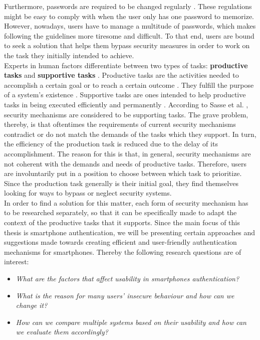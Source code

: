 Furthermore, passwords are required to be changed regularly \cite{adams2,gorman}. These regulations might be easy to comply with when the user only has one password to memorize. However, nowadays, users have to manage a multitude of passwords, which makes following the guidelines more tiresome and difficult. To that end, users are bound to seek a solution that helps them bypass security measures in order to work on the task they initially intended to achieve.\\

Experts in human factors differentiate between two types of tasks: \textbf{productive tasks} and \textbf{supportive tasks} \cite{sasse}. Productive tasks are the activities needed to accomplish a certain goal or to reach a certain outcome \cite{sasse}. They fulfill the purpose of a system's existence \cite{sasse}. Supportive tasks are ones intended to help productive tasks in being executed efficiently and permanently \cite{sasse}. According to Sasse et al. \cite{sasse}, security mechanisms are considered to be supporting tasks. The grave problem, thereby, is that oftentimes the requirements of current security mechanisms contradict or do not match the demands of the tasks which they support. In turn, the efficiency of the production task is reduced due to the delay of its accomplishment. The reason for this is that, in general, security mechanisms are not coherent with the demands and needs of productive tasks. Therefore, users are involuntarily put in a position to choose between which task to prioritize. Since the production task generally is their initial goal, they find themselves looking for ways to bypass or neglect security systems.\\

In order to find a solution for this matter, each form of security mechanism has to be researched separately, so that it can be specifically made to adapt the context of the productive tasks that it supports. Since the main focus of this thesis is smartphone authentication, we will be presenting certain approaches and suggestions made towards creating efficient and user-friendly authentication mechanisms for smartphones. Thereby the following research questions are of interest: 

\begin{itemize}
    \item \textit{What are the factors that affect usability in smartphones authentication?}
\item \textit{What is the reason for many users' insecure behaviour and how can we change it?} 
    \item \textit{How can we compare multiple systems based on their usability and how can we evaluate them accordingly?}
\end{itemize}

